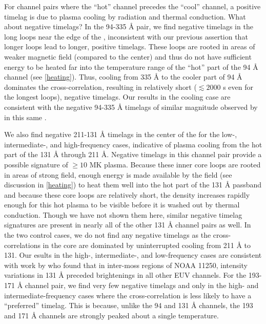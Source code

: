 For channel pairs where the ``hot'' channel precedes the ``cool'' channel, a positive timelag is due to plasma cooling by radiation and thermal conduction. What about negative timelags? In the 94-335 \AA{} pair, we find negative timelags in the long loops near the edge of the \AR{}, inconsistent with our previous assertion that longer loops lead to longer, positive timelags. These loops are rooted in areas of weaker magnetic field (compared to the center) and thus do not have sufficient energy to be heated far into the temperature range of the ``hot'' part of the 94 \AA{} channel (see \autoref{heating}). Thus, cooling from 335 \AA{} to the cooler part of 94 \AA{} dominates the cross-correlation, resulting in relatively short ($\lesssim2000$ s even for the longest loops), negative timelags. Our results in the cooling case are consistent with the negative 94-335 \AA{} timelags of similar magnitude observed by \citet{viall_survey_2017} in this same \AR{}.

We also find negative 211-131 \AA{} timelags in the center of the \AR{} for the low-, intermediate-, and high-frequency cases, indicative of plasma cooling from the hot part of the 131 \AA{} through 211 \AA{}. Negative timelags in this channel pair provide a possible signature of $\ge10$ MK plasma. Because these inner core loops are rooted in areas of strong field, enough energy is made available by the field (see discussion in \autoref{heating}) to heat them well into the hot part of the 131 \AA{} passband and because these core loops are relatively short, the density increases rapidly enough for this hot plasma to be visible before it is washed out by thermal conduction. Though we have not shown them here, similar negative timelag signatures are present in nearly all of the other 131 \AA{} channel pairs as well. In the two control cases, we do not find any negative timelags as the cross-correlations in the core are dominated by uninterrupted cooling from 211 \AA{} to 131. Our esults in the high-, intermediate-, and low-frequency cases are consistent with work by \citet{cadavid_heating_2014} who found that in inter-moss regions of \AR{} NOAA 11250, intensity variations in 131 \AA{} preceded brightenings in all other EUV channels. For the 193-171 \AA{} channel pair, we find very few negative timelags and only in the high- and intermediate-frequency cases where the cross-correlation is less likely to have a ``preferred'' timelag. This is because, unlike the 94 and 131 \AA{} channels, the 193 and 171 \AA{} channels are strongly peaked about a single temperature.

